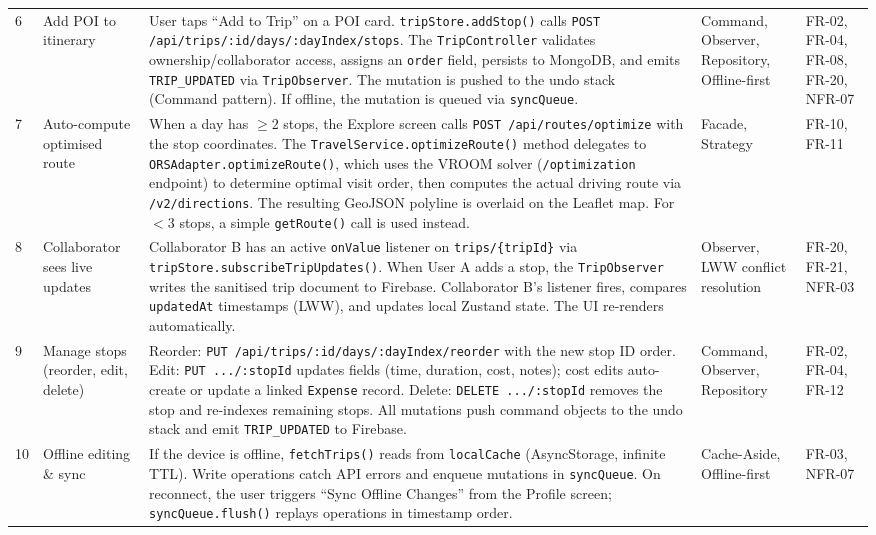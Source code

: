 \documentclass[12pt, a4paper]{article}
\newcommand{\code}[1]{\texttt{\small #1}}
\newcommand{\reqid}[1]{\textsc{\small #1}}
\begin{document}
\begin{longtable}{C{0.6cm} L{2.8cm} L{4.8cm} L{2.2cm} L{2.5cm}}
6 & Add POI to itinerary &
User taps ``Add to Trip'' on a POI card. \code{tripStore.addStop()} calls \code{POST /api/trips/:id/days/:dayIndex/stops}. The \code{TripController} validates ownership/collaborator access, assigns an \code{order} field, persists to MongoDB, and emits \code{TRIP\_UPDATED} via \code{TripObserver}. The mutation is pushed to the undo stack (Command pattern). If offline, the mutation is queued via \code{syncQueue}. &
Command, Observer, Repository, Offline-first &
\reqid{FR-02}, \reqid{FR-04}, \reqid{FR-08}, \reqid{FR-20}, \reqid{NFR-07} \\

7 & Auto-compute optimised route &
When a day has $\geq 2$ stops, the Explore screen calls \code{POST /api/routes/optimize} with the stop coordinates. The \code{TravelService.optimizeRoute()} method delegates to \code{ORSAdapter.optimizeRoute()}, which uses the VROOM solver (\code{/optimization} endpoint) to determine optimal visit order, then computes the actual driving route via \code{/v2/directions}. The resulting GeoJSON polyline is overlaid on the Leaflet map. For $< 3$ stops, a simple \code{getRoute()} call is used instead. &
Facade, Strategy &
\reqid{FR-10}, \reqid{FR-11} \\

8 & Collaborator sees live updates &
Collaborator B has an active \code{onValue} listener on \code{trips/\{tripId\}} via \code{tripStore.subscribeTripUpdates()}. When User A adds a stop, the \code{TripObserver} writes the sanitised trip document to Firebase. Collaborator B's listener fires, compares \code{updatedAt} timestamps (LWW), and updates local Zustand state. The UI re-renders automatically. &
Observer, LWW conflict resolution &
\reqid{FR-20}, \reqid{FR-21}, \reqid{NFR-03} \\

9 & Manage stops (reorder, edit, delete) &
Reorder: \code{PUT /api/trips/:id/days/:dayIndex/reorder} with the new stop ID order. Edit: \code{PUT .../:stopId} updates fields (time, duration, cost, notes); cost edits auto-create or update a linked \code{Expense} record. Delete: \code{DELETE .../:stopId} removes the stop and re-indexes remaining stops. All mutations push command objects to the undo stack and emit \code{TRIP\_UPDATED} to Firebase. &
Command, Observer, Repository &
\reqid{FR-02}, \reqid{FR-04}, \reqid{FR-12} \\

10 & Offline editing \& sync &
If the device is offline, \code{fetchTrips()} reads from \code{localCache} (AsyncStorage, infinite TTL). Write operations catch API errors and enqueue mutations in \code{syncQueue}. On reconnect, the user triggers ``Sync Offline Changes'' from the Profile screen; \code{syncQueue.flush()} replays operations in timestamp order. &
Cache-Aside, Offline-first &
\reqid{FR-03}, \reqid{NFR-07} \\

\end{longtable}
\end{document}
